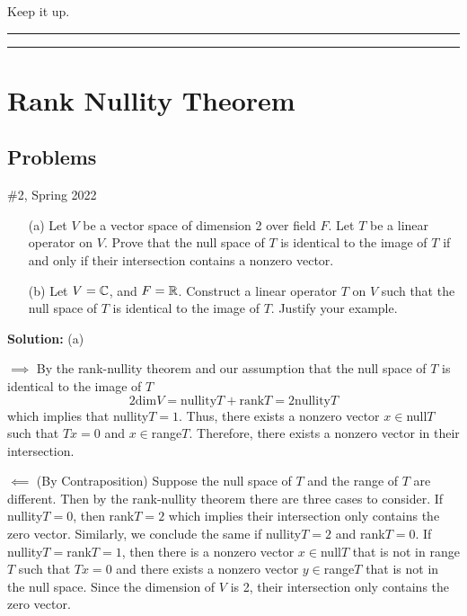 \documentclass{article}
\begin{document}
Keep it up.\\

\hrule \vspace{2pt}
\hrule

\break

\section{Rank Nullity Theorem}

\subsection{Problems}

\begin{problem}{\#2, Spring 2022}\;
	\begin{enumerate}
		\item[(a)] Let $V$ be a vector space of dimension 2 over field $F$. Let $T$ be a linear operator on $V$. Prove that the null space of $T$ is identical
				to the image of $T$ if and only if their intersection contains a nonzero vector. 
		\item[(b)] Let $V = \mathbb C$, and $F = \mathbb R$. Construct a linear operator $T$ on $V$ such that the null space of $T$ is identical to the image of $T$.
				Justify your example.
	\end{enumerate}
\end{problem}


\textbf{Solution:} (a)

	$\implies$ By the rank-nullity theorem and our assumption that the null space of $T$ is identical to the image of $T$ 
		\[ 2 \text{dim} V = \text{nullity} T + \text{rank} T = 2 \text{nullity} T\]
		which implies that nullity$T = 1$. Thus, there exists a nonzero vector $x\in$null$T$ such that $Tx = 0$ and $x\in$range$T$. Therefore, there exists
		a nonzero vector in their intersection.
		
	$\impliedby$ (By Contraposition) Suppose the null space of $T$ and the range of $T$ are different. Then by the rank-nullity theorem there are three cases
		to consider. If nullity$T = 0$, then rank$T = 2$ which implies their intersection only contains the zero vector. Similarly, we conclude the same if 
		nullity$T = 2$ and rank$T = 0$. If nullity$T =$rank$T = 1$, then there is a nonzero vector $x\in $null$T$ that is not in range$T$ such that $Tx=0$ and 
		there exists a nonzero vector $y\in$range$T$ that is not in the null space. Since the dimension of $V$ is 2, their intersection only contains the zero
		vector. 
		
\end{document}
